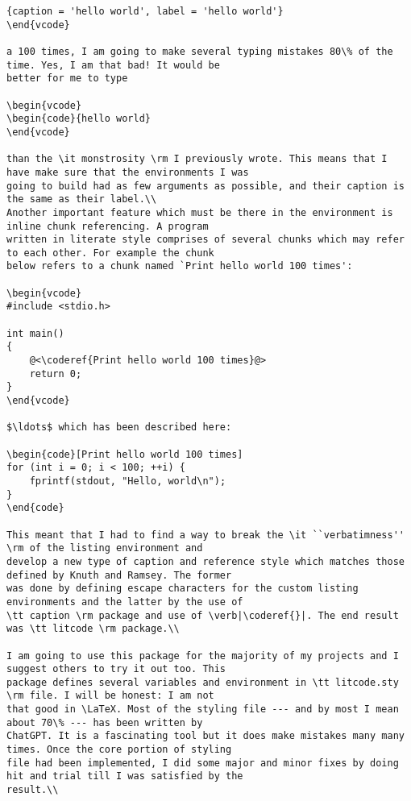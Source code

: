 \begin{vcode}
\begin{lstlisting}{caption = 'hello world', label = 'hello world'}
\end{vcode}

a 100 times, I am going to make several typing mistakes 80\% of the time. Yes, I am that bad! It would be
better for me to type 

\begin{vcode}
\begin{code}{hello world}
\end{vcode}

than the \it monstrosity \rm I previously wrote. This means that I have make sure that the environments I was
going to build had as few arguments as possible, and their caption is the same as their label.\\
Another important feature which must be there in the environment is inline chunk referencing. A program
written in literate style comprises of several chunks which may refer to each other. For example the chunk
below refers to a chunk named `Print hello world 100 times':

\begin{vcode}
#include <stdio.h>

int main()
{
    @<\coderef{Print hello world 100 times}@>
    return 0;
}
\end{vcode}

$\ldots$ which has been described here:

\begin{code}[Print hello world 100 times]
for (int i = 0; i < 100; ++i) {
    fprintf(stdout, "Hello, world\n");
}
\end{code}

This meant that I had to find a way to break the \it ``verbatimness'' \rm of the listing environment and
develop a new type of caption and reference style which matches those defined by Knuth and Ramsey. The former
was done by defining escape characters for the custom listing environments and the latter by the use of
\tt caption \rm package and use of \verb|\coderef{}|. The end result was \tt litcode \rm package.\\

I am going to use this package for the majority of my projects and I suggest others to try it out too. This
package defines several variables and environment in \tt litcode.sty \rm file. I will be honest: I am not
that good in \LaTeX. Most of the styling file --- and by most I mean about 70\% --- has been written by
ChatGPT. It is a fascinating tool but it does make mistakes many many times. Once the core portion of styling
file had been implemented, I did some major and minor fixes by doing hit and trial till I was satisfied by the
result.\\ 


\end{lstlisting}
\end{vcode}
